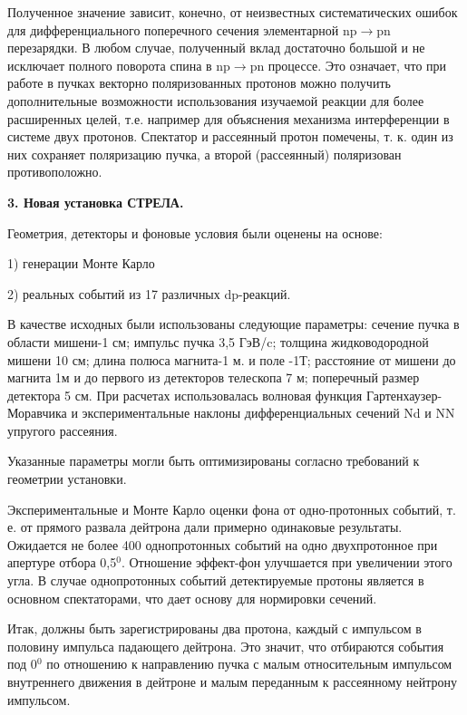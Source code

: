 \documentclass[a4paper,12pt]{article}
\begin{document}
{{        Полученное значение зависит, конечно, от неизвестных систематических
        ошибок для дифференциального поперечного сечения элементарной
        np$\to$pn перезарядки. В любом случае, полученный вклад достаточно
        большой и не исключает полного поворота спина
        в np$\to$pn процессе. Это означает, что при работе
        в пучках векторно поляризованных протонов
        можно получить дополнительные возможности
        использования изучаемой реакции для более расширенных целей,
        т.е. например для объяснения механизма интерферен\-ции в системе
        двух протонов. Спектатор и рас\-сеянный протон помечены,
        т. к. один из них сохраняет поляризацию пучка, а второй (рассеянный)
        поляризован противоположно.

        \vspace {10mm}
        \newpage

        {\Large \bf 3. Новая установка СТРЕЛА.}

        \vspace {10mm}
        Геометрия, детекторы и фоновые условия были оценены на основе:

        \vspace {8mm}
        1) генерации Монте Карло

        \vspace {8mm}
        2) реальных событий из 17 различных dp-реакций.

        \vspace {10mm}
        В качестве исходных были использованы следующие параметры:
        сече\-ние пучка в области мишени-1 см; импульс пучка 3,5 ГэВ/c;
        толщина жидко\-водородной мишени 10 см; длина полюса магнита-1 м.
        и поле -1Т; расстояние от мишени до магнита 1м и до первого
        из детекторов телескопа 7 м; поперечный размер детектора 5 см.
        При расчетах исполь\-зовалась волновая функция
        Гартенхаузер-Мо\-равчика и экспериментальные наклоны
        дифференциальных сечений Nd и NN упругого рассеяния.

        Указанные параметры могли быть оптимизированы согласно
        требова\-ний к геометрии установки.

        Экспериментальные и Монте Карло оценки фона от одно-протонных
        событий, т. е. от прямого развала дейтрона дали примерно одинаковые
        результаты. Ожидается не более 400 однопротонных событий на одно
        двухпротонное при апертуре отбора 0,5$^0$. Отношение эффект-фон
        улуч\-шается при увеличении этого угла. В случае однопротонных
        событий детекти\-руемые протоны является в основном спектаторами,
        что дает основу для норми\-ровки сечений.

        Итак, должны быть зарегистрированы два протона, каждый с импуль\-сом
        в половину импульса падающего дейтрона. Это значит, что отби\-раются
        события под 0$^0$ по отношению к направлению пучка с малым
        относитель\-ным импульсом внутрен\-него движения в дейтроне и малым
        переданным к рассеянному нейтрону импульсом.

}}
\end{document}
